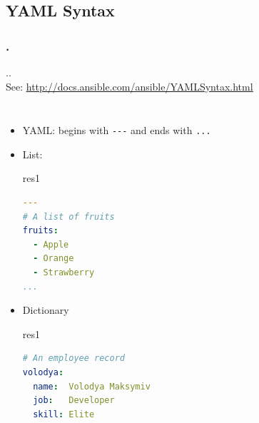 \documentclass[pdf, 8pt, unicode, t]{beamer} %
\newcommand{\bluetext}[1]{{\usebeamercolor[fg]{bluetext_color}#1}}
\newcommand{\myinsertsubsection}{\alert{\Large\insertsectionnumber.\insertsubsectionnumber. \insertsubsection}\\}
\newcommand{\frametitlesection}{\frametitle{\thesection. \secname}}
\begin{document}
\subsection{YAML Syntax}
\begin{frame}[fragile,label=yaml2]
\frametitlesection
\myinsertsubsection
\vspace{1em}
See: \bluetext{\small\href{http://docs.ansible.com/ansible/YAMLSyntax.html}{\underline{http://docs.ansible.com/ansible/YAMLSyntax.html}}}

\begin{columns}[t,onlytextwidth]
\begin{itemize}
  \item YAML: begins with \verb!---! and ends with \verb|...|
  \item List:
  \begin{beamercolorbox}[dp=1ex,left,leftskip=50ex,wd=0.9\textwidth,sep=-1.0em,rounded=true,shadow=true]{res1}
  \begin{lstlisting}[language=yaml]
---
# A list of fruits
fruits:
  - Apple
  - Orange
  - Strawberry
...
  \end{lstlisting}
  \end{beamercolorbox}

  \item Dictionary
  \begin{beamercolorbox}[wd=0.9\textwidth,sep=-1.0em,rounded=true,shadow=true,center]{res1}
  \begin{lstlisting}[language=yaml]
# An employee record
volodya:
  name:  Volodya Maksymiv
  job:   Developer
  skill: Elite
  \end{lstlisting}
  \end{beamercolorbox}
\end{itemize}
\end{columns}
\end{frame}
\end{document}
